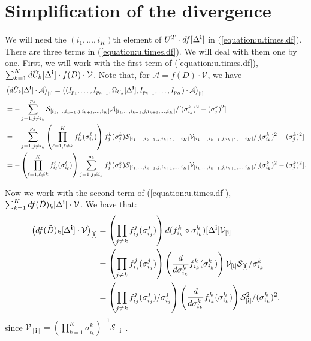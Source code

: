 \section{Simplification of the divergence}
\label{sec:simp.div}
We will need the $(i_1,\ldots,i_K)$th element of $U^T \cdot df[\Delta^{\bf i}]$ in (\ref{equation:u.times.df}). There are three terms in (\ref{equation:u.times.df}). We will deal with them one by one. First, we will work with the first term of (\ref{equation:u.times.df}), $\sum_{k=1}^Kd\tilde{U}_k[\Delta^{\bf i}] \cdot f(D) \cdot \mathcal{V}$.
Note that, for $\mathcal{A} = f(D)\cdot\mathcal{V}$, we have
\begin{align*}
&\left(d\tilde{U}_k[\Delta^{\bf i}] \cdot \mathcal{A}\right)_{[\mathbf{i}]} = \left((I_{p_1},\ldots,I_{p_{k-1}},\Omega_{U_k}[\Delta^{\bf i}],I_{p_{k+1}},\ldots,I_{p_K})\cdot \mathcal{A}\right)_{[\mathbf{i}]}\\
&= -\sum_{j=1, j\neq i_k}^{p_k}\mathcal{S}_{[i_1,\ldots,i_{k-1},j,i_{k+1},\ldots,i_K]}\mathcal{A}_{[i_1,\ldots,i_{k-1},j,i_{k+1},\ldots,i_K]}/[(\sigma_{i_k}^k)^2 - (\sigma_j^k)^2]\\
&= -\sum_{j=1, j\neq i_k}^{p_k}\left(\prod_{\ell=1,\ell \neq k}^Kf_{i_{\ell}}^{\ell}(\sigma_{i_{\ell}}^{\ell})\right)f_j^k(\sigma_j^k)\mathcal{S}_{[i_1,\ldots,i_{k-1},j,i_{k+1},\ldots,i_K]}\mathcal{V}_{[i_1,\ldots,i_{k-1},j,i_{k+1},\ldots,i_K]}/[(\sigma_{i_k}^k)^2 - (\sigma_j^k)^2]\\
&= -\left(\prod_{\ell=1,\ell \neq k}^Kf_{i_{\ell}}^{\ell}(\sigma_{i_{\ell}}^{\ell})\right)\sum_{j=1, j\neq i_k}^{p_k}f_j^k(\sigma_j^k)\mathcal{S}_{[i_1,\ldots,i_{k-1},j,i_{k+1},\ldots,i_K]}\mathcal{V}_{[i_1,\ldots,i_{k-1},j,i_{k+1},\ldots,i_K]}/[(\sigma_{i_k}^k)^2 - (\sigma_j^k)^2].
\end{align*}

Now we work with the second term of (\ref{equation:u.times.df}),
$\sum_{k=1}^K df(\tilde{D})_k[\Delta^{\bf i}] \cdot \mathcal{V}$.
We have that:
\begin{align}
\left(df(\tilde{D})_k[\Delta^{\bf i}] \cdot
  \mathcal{V}\right)_{[\mathbf{i}]} &= \left(\prod_{j\neq
    k}f_{i_j}^j(\sigma_{i_j}^j)\right)d(f_{i_k}^k \circ
\sigma_{i_k}^k)[\Delta^{\bf i}]\mathcal{V}_{[\mathbf{i}]} \label{equation:simp.diff.first}\\
&= \left(\prod_{j\neq k}f_{i_j}^j(\sigma_{i_j}^j)\right)\left(\frac{d}{d\sigma_{i_k}^k}f_{i_k}^k(\sigma_{i_k}^k)\right)\mathcal{V}_{[\mathbf{i}]}\mathcal{S}_{[\mathbf{i}]}/\sigma_{i_k}^k\nonumber\\
&= \left(\prod_{j\neq k}f_{i_j}^j(\sigma_{i_j}^j)/\sigma_{i_j}^j\right)\left(\frac{d}{d\sigma_{i_k}^k}f_{i_k}^k(\sigma_{i_k}^k)\right)\mathcal{S}_{[\mathbf{i}]}^2/(\sigma_{i_k}^k)^2, \label{equation:final.form.second.term}
\end{align}
since $\mathcal{V}_{[\mathbf{i}]} = \left(\prod_{k=1}^K\sigma_{i_k}^k\right)^{-1}\mathcal{S}_{[\mathbf{i}]}$. 

